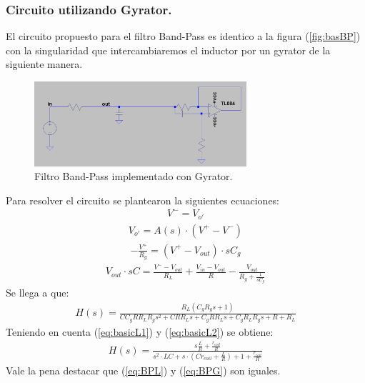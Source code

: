 \documentclass[a4paper]{article}
\begin{document}
\subsubsection{Circuito utilizando Gyrator.}
El circuito propuesto para el filtro Band-Pass es identico a la figura (\ref{fig:basBP}) con la singularidad que intercambiaremos el inductor por un gyrator de la siguiente manera.
\begin{figure}[H]	
	\centering
	\includegraphics[width=0.7\textwidth]{ImagenesEj2/gyrBP.PNG}
	\caption{Filtro Band-Pass implementado con Gyrator.}
	\label{fig:gyrBP}
\end{figure}
Para resolver el circuito se plantearon la siguientes ecuaciones:
\begin{align}V^- = V_{o'}\end{align}
\begin{align}V_{o'} = A(s)\cdot (V^+-V^-)\end{align}
\begin{align} -\frac{V^+}{R_g}=(V^+-V_{out})\cdot sC_g \end{align}
\begin{align}  V_{out}\cdot sC= \frac{V^--V_{out}}{R_L}+\frac{V_{in}-V_{out}}{R}-\frac{V_{out}}{R_g+\frac{1}{sC_g}}\end{align}
Se llega a que:
\begin{align}H(s)=\frac{R_{L} \left(C_{g} R_{g} s + 1\right)}{C C_{g} R R_{L} R_{g} s^{2} + C R R_{L} s + C_{g} R R_{L} s + C_{g} R_{L} R_{g} s + R + R_{L}}
\end{align}
Teniendo en cuenta (\ref{eq:basicL1}) y (\ref{eq:basicL2}) se obtiene:
\begin{align}H(s)=\frac{s\frac{L}{R}+\frac{r_{coil}}{R}}{s^2\cdot LC +s \cdot (Cr_{coil}+\frac{L}{R})+1+\frac{r_{coil}}{R}}
\label{eq:BPG}
\end{align}
Vale la pena destacar que (\ref{eq:BPL}) y (\ref{eq:BPG}) son iguales.
\end{document}
